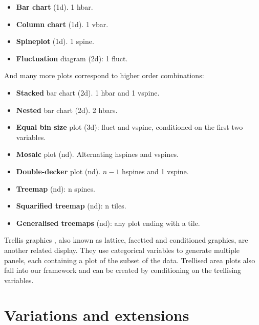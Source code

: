 \documentclass[journal]{vgtc}
\begin{document}
\begin{itemize}
  \setlength{\itemsep}{0em}
  \item {\bf Bar chart} (1d). 1 hbar.
  \item {\bf Column chart} (1d). 1 vbar.
  \item {\bf Spineplot} (1d). 1 spine.
  \item {\bf Fluctuation} diagram (2d): 1 fluct.
\end{itemize}

\noindent And many more plots correspond to higher order combinations:

\begin{itemize}
  \setlength{\itemsep}{0em}
  
  \item {\bf Stacked} bar chart (2d). 1 hbar and 1 vspine.

  \item {\bf Nested} bar chart \citep{peltier:2009} (2d).  2 hbars. 

  \item {\bf Equal bin size} \citep{hofmann:2000} plot (3d): fluct and vspine, conditioned on the first two variables.

  \item {\bf Mosaic} plot \citep{hartigan:1981,friendly:1994,hofmann:2003} (nd). Alternating hspines and vspines. 

  \item {\bf Double-decker} plot \citep{hofmann:2001} (nd). $n-1$ hspines and 1 vspine. 

  \item {\bf Treemap} \citep{shneiderman:1992} (nd): n spines.

  \item {\bf Squarified treemap} \citep{bruls:1999} (nd): n tiles. 

  \item {\bf Generalised treemaps} \citep{vliegen:2006} (nd): any plot ending with a tile.

\end{itemize}

Trellis graphics \citep{becker:1996}, also known as lattice, facetted and conditioned graphics, are another related display. They use categorical variables to generate multiple panels, each containing a plot of the subset of the data. Trellised area plots also fall into our framework and can be created by conditioning on the trellising variables.

\section{Variations and extensions}
\label{sec:variations}
\end{document}
